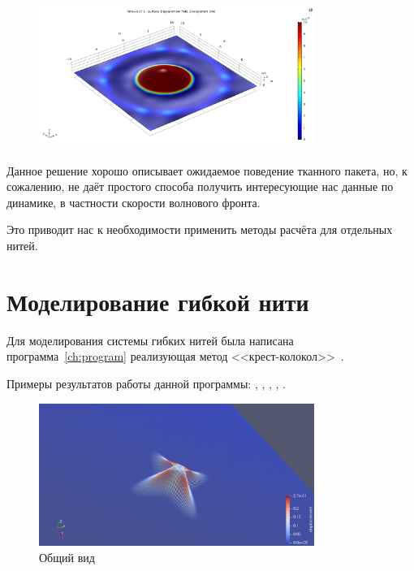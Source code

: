 \begin{figure}[H]
    \centering
    \includegraphics[width=0.8\textwidth]{img/comsol/example_1.png}
    \caption{}
    \label{pic:comsol-example-1}
\end{figure}

Данное решение хорошо описывает ожидаемое поведение тканного пакета, но, к сожалению, не даёт простого способа
получить интересующие нас данные по динамике, в частности скорости волнового фронта.

Это приводит нас к необходимости применить методы расчёта для отдельных нитей.

\section{Моделирование гибкой нити}\label{sec:model-fibers}
Для моделирования системы гибких нитей была написана программа~\ref{ch:program} реализующая метод
<<крест-колокол>>~\cite{rakhmatulin}.

Примеры результатов работы данной программы: ,
, ,
, .

\begin{figure}[H]
    \centering
    \includegraphics[width=0.8\textwidth]{img/fiber/example_overview.png}
    \caption{Общий вид}
    \label{pic:fiber-example-overview}
\end{figure}

